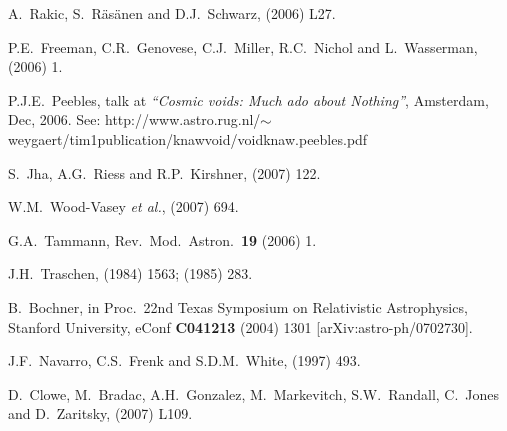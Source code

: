 \documentclass[12pt]{article}
\begin{document}
\begin{thebibliography}{66}
A.~Rakic, S.~R\"as\"anen and D.J.~Schwarz,
 (2006) L27. %

P.E.~Freeman, C.R.~Genovese, C.J.~Miller, R.C.~Nichol and L.~Wasserman,
 (2006) 1. %

P.J.E.~Peebles,
talk at {\em``Cosmic voids: Much ado about Nothing''}, Amsterdam,
Dec, 2006. See:\hfil\break
http://www.astro.rug.nl/$\mathop{\sim}\limits$weygaert/tim1publication/knawvoid/voidknaw.peebles.pdf

S.~Jha, A.G.~Riess and R.P.~Kirshner,
 (2007) 122. %

W.M.~Wood-Vasey {\it et al.},
 (2007) 694. %

G.A.~Tammann,
Rev.\ Mod.\ Astron.\ {\bf19} (2006) 1. %

J.H.~Traschen,
 (1984) 1563;
 (1985) 283.

B.~Bochner,
in Proc.\ 22nd Texas Symposium on Relativistic Astrophysics, Stanford
University, eConf {\bf C041213} (2004) 1301 [arXiv:astro-ph/0702730].

J.F.~Navarro, C.S.~Frenk and S.D.M.~White,
 (1997) 493. %

D.~Clowe, M.~Bradac, A.H.~Gonzalez, M.~Markevitch, S.W.~Randall, C.~Jones
and D.~Zaritsky,
 (2007) L109. %


\end{thebibliography}
\end{document}
